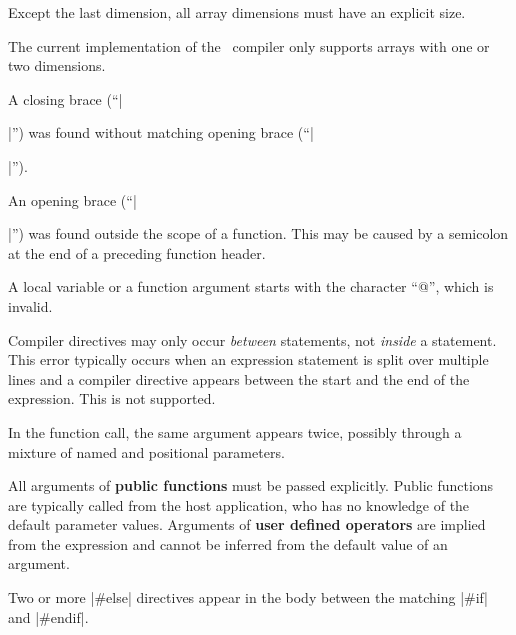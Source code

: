 { 
        Except the last dimension, all array dimensions must have an explicit
        size.

 
        The current implementation of the \Small\ compiler only supports
        arrays with one or two dimensions.

 
        A closing brace (``|}|'') was found without matching opening brace
        (``|{|'').

 
        An opening brace (``|{|'') was found outside the scope of a function.
        This may be caused by a semicolon at the end of a preceding function
        header.

 
        A local variable or a function argument starts with the character ``@'',
        which is invalid.

 
        Compiler directives may only occur {\it between\/} statements, not
        {\it inside\/} a statement. This error typically occurs when an
        expression statement is split over multiple lines and a compiler
        directive appears between the start and the end of the expression.
        This is not supported.

        In the function call, the same argument appears twice, possibly through
        a mixture of named and positional parameters.

 
        All arguments of {\bf public functions} must be passed explicitly. Public
        functions are typically called from the host application, who has no
        knowledge of the default parameter values. Arguments of {\bf user defined
        operators} are implied from the expression and cannot be inferred from
        the default value of an argument.

 
        Two or more |#else| directives appear in the body between the matching
        |#if| and |#endif|.

}}
